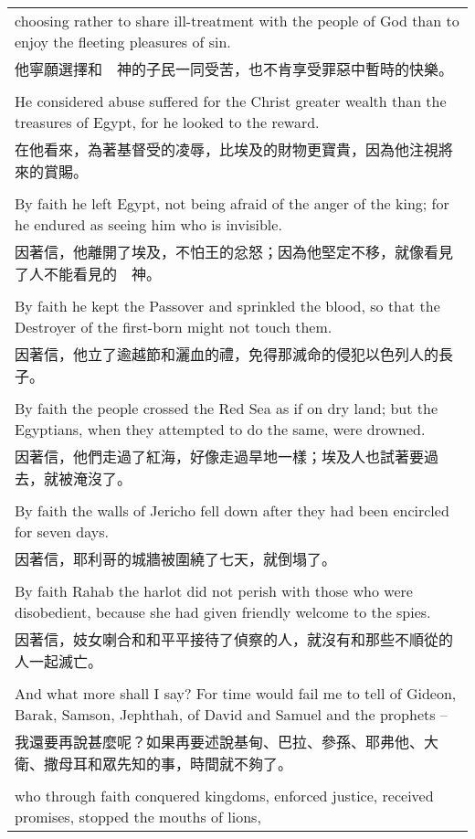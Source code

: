 \begin{tabularx}{\textwidth}{p{}}
choosing rather to share ill-treatment with the people of God than to enjoy the fleeting pleasures of sin. \\
他寧願選擇和　神的子民一同受苦，也不肯享受罪惡中暫時的快樂。 \\ \\
He considered abuse suffered for the Christ greater wealth than the treasures of Egypt, for he looked to the reward. \\
在他看來，為著基督受的凌辱，比埃及的財物更寶貴，因為他注視將來的賞賜。 \\ \\
By faith he left Egypt, not being afraid of the anger of the king; for he endured as seeing him who is invisible. \\
因著信，他離開了埃及，不怕王的忿怒；因為他堅定不移，就像看見了人不能看見的　神。 \\ \\
By faith he kept the Passover and sprinkled the blood, so that the Destroyer of the first-born might not touch them. \\
因著信，他立了逾越節和灑血的禮，免得那滅命的侵犯以色列人的長子。 \\ \\
By faith the people crossed the Red Sea as if on dry land; but the Egyptians, when they attempted to do the same, were drowned. \\
因著信，他們走過了紅海，好像走過旱地一樣；埃及人也試著要過去，就被淹沒了。 \\ \\
By faith the walls of Jericho fell down after they had been encircled for seven days. \\
因著信，耶利哥的城牆被圍繞了七天，就倒塌了。 \\ \\
By faith Rahab the harlot did not perish with those who were disobedient, because she had given friendly welcome to the spies. \\
因著信，妓女喇合和和平平接待了偵察的人，就沒有和那些不順從的人一起滅亡。 \\ \\
And what more shall I say? For time would fail me to tell of Gideon, Barak, Samson, Jephthah, of David and Samuel and the prophets -- \\
我還要再說甚麼呢？如果再要述說基甸、巴拉、參孫、耶弗他、大衛、撒母耳和眾先知的事，時間就不夠了。 \\ \\
who through faith conquered kingdoms, enforced justice, received promises, stopped the mouths of lions, \\

\end{tabularx}
